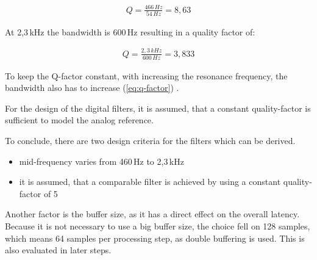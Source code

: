 \begin{align}
    Q = \frac{466\,Hz}{54\,Hz} = 8,63
\end{align}

At 2,3\,kHz the bandwidth is 600\,Hz resulting in a quality factor of:

\begin{align}
    Q = \frac{2,3\,kHz}{600\,Hz} = 3,833
\end{align}

To keep the Q-factor constant, with increasing the resonance frequency, the bandwidth also has to increase
(\autoref{eq:q-factor}) \cite{taschenbuch_et}.

For the design of the digital filters, it is assumed, that a constant quality-factor is sufficient to model
the analog reference.

To conclude, there are two design criteria for the filters which can be derived.

\begin{itemize}
    \item mid-frequency varies from 460\,Hz to 2,3\,kHz
    \item it is assumed, that a comparable filter is achieved by using a constant quality-factor of 5
\end{itemize}

Another factor is the buffer size, as it has a direct effect on the overall latency.
Because it is not necessary to use a big buffer size, the choice fell on 128 samples, which means
64 samples per processing step, as double buffering is used. This is also evaluated in later steps.
